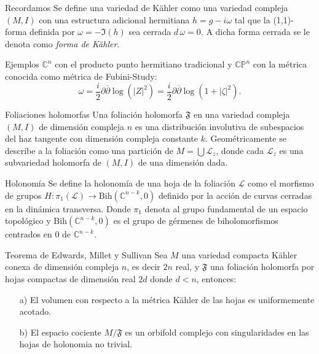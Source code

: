 \documentclass[letterpaper]{beamer}
\newcommand{\co}{\ensuremath{\mathbb C }}
\newcommand{\con}{\ensuremath{\mathbb{C}^n}}
\newcommand{\cp}{\ensuremath{\mathbb{CP}}}
\begin{document}
\begin{frame}
\begin{block}{Recordamos}
Se define una variedad de K\"ahler como una variedad compleja $(M,I)$ con una estructura adicional hermitiana $h=g-i\omega$ tal que la (1,1)-forma definida por $\omega=-\Im (h)$ sea cerrada $d\,\omega=0$. A dicha forma cerrada se le denota como \emph{forma de K\"ahler}.
\end{block}
\begin{block}{Ejemplos}
$\con$ con el producto punto hermitiano tradicional y $\cp^{n}$ con la m\'etrica conocida como m\'etrica de Fubini-Study:
\[
    \omega=\frac{i}{2}\partial\overline{\partial}\log(|Z|^{2})=\frac{i}{2}\partial\overline{\partial}\log(1+|\zeta|^{2}).
\]
\end{block}
\end{frame}

\begin{frame}
  \begin{block}{Foliaciones holomorfas}
  Una foliaci\'on holomorfa $\mathfrak{F}$ en una variedad compleja $(M,I)$ de dimensi\'on compleja $n$ es una distribuci\'on involutiva de
  subespacios del haz tangente  con dimensi\'on compleja constante $k$. Geom\'etricamente se describe a la foliaci\'on como una
  partici\'on de $M=\bigcup\mathcal{L}_z$, donde cada $\mathcal{L}_z$ es una subvariedad holomorfa de $(M,I)$ de una dimensi\'on dada.
\end{block}

\begin{block}{Holonom\'ia}
  Se define la holonom\'ia de una hoja de la foliaci\'on $\mathcal{L}$ como el morfismo de grupos $H:\pi_{1}(\mathcal{L})
  \rightarrow\textrm{Bih}(\co^{n-k},0)$ definido por la acci\'on de curvas cerradas en la din\'amica transversa.
  Donde $\pi_{1}$ denota al grupo fundamental de un espacio topol\'ogico y $\textrm{Bih}(\co^{n-k},0)$ es el grupo de
  g\'ermenes de biholomorfismos centrados en $0$ de $\co^{n-k}$.
\end{block}
\end{frame}

\begin{frame}
\begin{block}{Teorema de Edwards, Millet y Sullivan}\label{EMS}
        Sea $M$ una variedad compacta K\"ahler conexa de dimensi\'on compleja $n$, es decir $2n$ real, y $\mathfrak{F}$ una foliaci\'on holomorfa por hojas
        compactas de dimensi\'on real $2d$ donde $d<n$, entonces:
        \begin{enumerate}
                \item[a)] El volumen con respecto a la m\'etrica K\"ahler de las hojas es uniformemente acotado.
                \item[b)] El espacio cociente $M/\mathfrak{F}$ es un orbifold complejo con singularidades en las hojas de holonomia no trivial.
        \end{enumerate}
      \end{block}
\end{frame}
\end{document}
